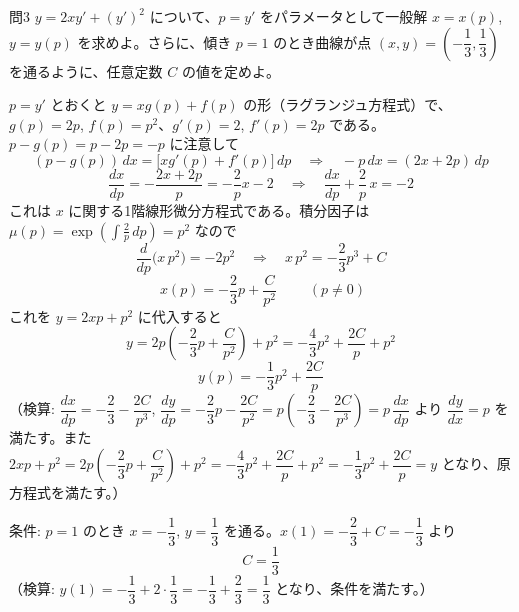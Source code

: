\documentclass[a4paper,11pt]{article}
\begin{document}
\clearpage
\begin{mondaiboxS}{問3}
$y = 2xy' + (y')^{2}$ について、$p = y'$ をパラメータとして一般解 $x = x(p)$, $y = y(p)$ を求めよ。さらに、傾き $p = 1$ のとき曲線が点 $(x, y) = \left(-\dfrac{1}{3}, \dfrac{1}{3}\right)$ を通るように、任意定数 $C$ の値を定めよ。
\end{mondaiboxS}
\kaitou
$p = y'$ とおくと $y = xg(p) + f(p)$ の形（ラグランジュ方程式）で、$g(p) = 2p$, $f(p) = p^{2}$、$g'(p) = 2$, $f'(p) = 2p$ である。$p - g(p) = p - 2p = -p$ に注意して
\[
(p - g(p))\,dx = \bigl[x g'(p) + f'(p)\bigr]\,dp
\quad\Longrightarrow\quad
-p\,dx = (2x + 2p)\,dp
\]
\[
\frac{dx}{dp} = -\frac{2x + 2p}{p} = -\frac{2}{p}x - 2
\quad\Longrightarrow\quad
\frac{dx}{dp} + \frac{2}{p}\,x = -2
\]
これは $x$ に関する1階線形微分方程式である。積分因子は $\mu(p) = \exp\left(\displaystyle\int \frac{2}{p}\,dp\right) = p^{2}$ なので
\[
\frac{d}{dp}\bigl(x\,p^{2}\bigr) = -2p^{2}
\quad\Longrightarrow\quad
x\,p^{2} = -\frac{2}{3}p^{3} + C
\]
\[
\boxed{\; x(p) = -\frac{2}{3}p + \frac{C}{p^{2}} \;}
\qquad (p \neq 0)
\]
これを $y = 2xp + p^{2}$ に代入すると
\[
y = 2p\left(-\frac{2}{3}p + \frac{C}{p^{2}}\right) + p^{2}
= -\frac{4}{3}p^{2} + \frac{2C}{p} + p^{2}
\]
\[
\boxed{\; y(p) = -\frac{1}{3}p^{2} + \frac{2C}{p} \;}
\]
（検算: $\dfrac{dx}{dp} = -\dfrac{2}{3} - \dfrac{2C}{p^{3}}$, $\dfrac{dy}{dp} = -\dfrac{2}{3}p - \dfrac{2C}{p^{2}} = p\left(-\dfrac{2}{3} - \dfrac{2C}{p^{3}}\right) = p\,\dfrac{dx}{dp}$ より $\dfrac{dy}{dx} = p$ を満たす。また $2xp + p^{2} = 2p\left(-\dfrac23 p + \dfrac{C}{p^2}\right)+p^2 = -\dfrac43p^2+\dfrac{2C}{p}+p^2 = -\dfrac13 p^2+\dfrac{2C}{p} = y$ となり、原方程式を満たす。）

条件: $p = 1$ のとき $x = -\dfrac{1}{3}$, $y = \dfrac{1}{3}$ を通る。$x(1) = -\dfrac{2}{3} + C = -\dfrac{1}{3}$ より
\[
\boxed{\; C = \frac{1}{3} \;}
\]
（検算: $y(1) = -\dfrac{1}{3} + 2 \cdot \dfrac{1}{3} = -\dfrac{1}{3} + \dfrac{2}{3} = \dfrac{1}{3}$ となり、条件を満たす。）
\end{document}
